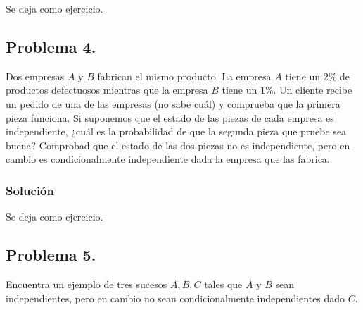 \documentclass[
]{article}
\begin{document}
Se deja como ejercicio.

\hypertarget{problema-4.}{%
\subsection{Problema 4.}\label{problema-4.}}

Dos empresas \(A\) y \(B\) fabrican el mismo producto. La empresa \(A\)
tiene un \(2\%\) de productos defectuosos mientras que la empresa \(B\)
tiene un \(1\%\). Un cliente recibe un pedido de una de las empresas (no
sabe cuál) y comprueba que la primera pieza funciona. Si suponemos que
el estado de las piezas de cada empresa es independiente, ¿cuál es la
probabilidad de que la segunda pieza que pruebe sea buena? Comprobad que
el estado de las dos piezas no es independiente, pero en cambio es
condicionalmente independiente dada la empresa que las fabrica.

\hypertarget{soluciuxf3n-21}{%
\subsubsection{Solución}\label{soluciuxf3n-21}}

Se deja como ejercicio.

\hypertarget{problema-5.}{%
\subsection{Problema 5.}\label{problema-5.}}

Encuentra un ejemplo de tres sucesos \(A,B,C\) tales que \(A\) y \(B\)
sean independientes, pero en cambio no sean condicionalmente
independientes dado \(C\).
\end{document}
